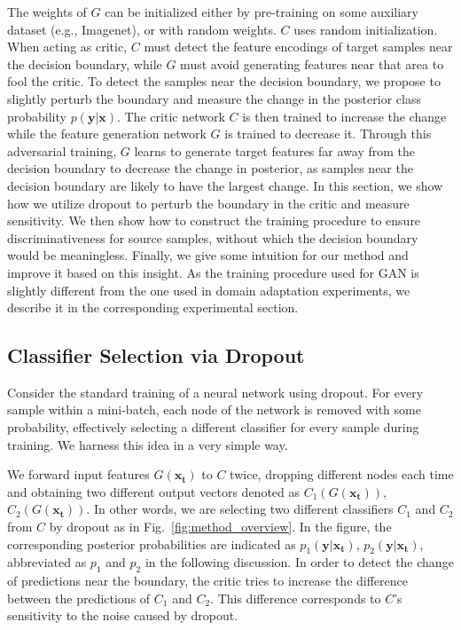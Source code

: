 \documentclass{article} \usepackage{iclr2018_conference,times}
\begin{document}
The weights of $G$ can be initialized either by pre-training on some auxiliary dataset (e.g., Imagenet), or with random weights. $C$ uses random initialization. 
When acting as critic, $C$ must detect the feature encodings of target samples near the decision boundary, while $G$ must avoid generating features near that area to fool the critic. To detect the samples near the decision boundary, we propose to slightly perturb the boundary and measure the change in the posterior class probability $p(\mathbf{y}|\mathbf{x})$. The critic network $C$ is then trained to increase the change while the feature generation network $G$ is trained to decrease it. Through this adversarial training, $G$ learns to generate target features far away from the decision boundary to decrease the change in posterior, as samples near the decision boundary are likely to have the largest change. 
In this section, we show how we utilize dropout to perturb the boundary in the critic and measure sensitivity. We then show how to construct the training procedure to ensure discriminativeness for source samples, without which the decision boundary would be meaningless. Finally, we give some intuition for our method and improve it based on this insight.
As the training procedure used for GAN is slightly different from the one used in domain adaptation experiments, we describe it in the corresponding experimental section. 

\subsection{Classifier Selection via Dropout}
\vspace{-3mm}        


Consider the standard training of a neural network using dropout. For every sample within a mini-batch, each node of the network is removed with some probability, effectively selecting a different classifier for every sample during training. We harness this idea in a very simple way.

We forward input features $G(\mathbf{x_t})$ to $C$ twice, dropping different nodes each time and obtaining two different output vectors denoted as $C_1(G(\mathbf{x_t}))$, $C_2(G(\mathbf{x_t}))$. In other words, we are selecting two different classifiers $C_1$ and $C_2$ from $C$ by dropout as in Fig.~\ref{fig:method_overview}. In the figure, the corresponding posterior probabilities are indicated as $p_1(\mathbf{y}|\mathbf{x_t})$, $p_2(\mathbf{y}|\mathbf{x_t})$, abbreviated as $p_1$ and $p_2$ in the following discussion. In order to detect the change of predictions near the boundary, the critic tries to increase the difference between the predictions of $C_1$ and $C_2$. This difference corresponds to $C$'s sensitivity to the noise caused by dropout. 
\end{document}
